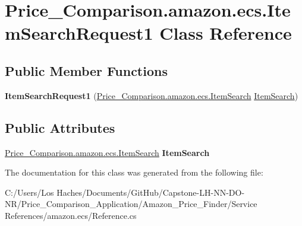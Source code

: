 \hypertarget{class_price___comparison_1_1amazon_1_1ecs_1_1_item_search_request1}{\section{Price\-\_\-\-Comparison.\-amazon.\-ecs.\-Item\-Search\-Request1 Class Reference}
\label{class_price___comparison_1_1amazon_1_1ecs_1_1_item_search_request1}
}
\subsection*{Public Member Functions}
\begin{DoxyCompactItemize}
\item 
\hypertarget{class_price___comparison_1_1amazon_1_1ecs_1_1_item_search_request1_ac80eee432169b995f376a8d66cf4bfb6}{{\bfseries Item\-Search\-Request1} (\hyperlink{class_price___comparison_1_1amazon_1_1ecs_1_1_item_search}{Price\-\_\-\-Comparison.\-amazon.\-ecs.\-Item\-Search} \hyperlink{class_price___comparison_1_1amazon_1_1ecs_1_1_item_search}{Item\-Search})}\label{class_price___comparison_1_1amazon_1_1ecs_1_1_item_search_request1_ac80eee432169b995f376a8d66cf4bfb6}

\end{DoxyCompactItemize}
\subsection*{Public Attributes}
\begin{DoxyCompactItemize}
\item 
\hypertarget{class_price___comparison_1_1amazon_1_1ecs_1_1_item_search_request1_adc97fb6b96a301be1e2699be8d038886}{\hyperlink{class_price___comparison_1_1amazon_1_1ecs_1_1_item_search}{Price\-\_\-\-Comparison.\-amazon.\-ecs.\-Item\-Search} {\bfseries Item\-Search}}\label{class_price___comparison_1_1amazon_1_1ecs_1_1_item_search_request1_adc97fb6b96a301be1e2699be8d038886}

\end{DoxyCompactItemize}


The documentation for this class was generated from the following file\-:\begin{DoxyCompactItemize}
\item 
C\-:/\-Users/\-Los Haches/\-Documents/\-Git\-Hub/\-Capstone-\/\-L\-H-\/\-N\-N-\/\-D\-O-\/\-N\-R/\-Price\-\_\-\-Comparison\-\_\-\-Application/\-Amazon\-\_\-\-Price\-\_\-\-Finder/\-Service References/amazon.\-ecs/Reference.\-cs\end{DoxyCompactItemize}
